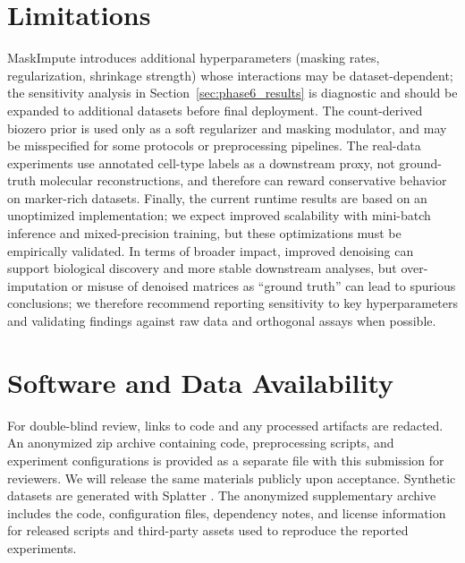 \documentclass{article}
\theoremstyle{plain}
\theoremstyle{definition}
\theoremstyle{remark}
\begin{document}
\section{Limitations}
MaskImpute introduces additional hyperparameters (masking rates, regularization,
shrinkage strength) whose interactions may be dataset-dependent; the sensitivity
analysis in Section~\ref{sec:phase6_results} is diagnostic and should be
expanded to additional datasets before final deployment. The count-derived
biozero prior is used only as a soft regularizer and masking modulator, and may
be misspecified for some
protocols or preprocessing pipelines. The real-data experiments use annotated
cell-type labels as a downstream proxy, not ground-truth molecular
reconstructions, and therefore can reward conservative behavior on marker-rich
datasets. Finally, the current runtime results are
based on an unoptimized implementation; we expect improved scalability with
mini-batch inference and mixed-precision training, but these optimizations must
be empirically validated.
In terms of broader impact, improved denoising can support biological discovery
and more stable downstream analyses, but over-imputation or misuse of denoised
matrices as ``ground truth'' can lead to spurious conclusions; we therefore
recommend reporting sensitivity to key hyperparameters and validating findings
against raw data and orthogonal assays when possible.

\section{Software and Data Availability}
For double-blind review, links to code and any processed artifacts are redacted.
An anonymized zip archive containing code, preprocessing scripts, and experiment
configurations is provided as a separate file with this submission for
reviewers. We will release the same materials publicly upon acceptance.
Synthetic datasets are generated with Splatter \citep{zappia2017splatter}.
The anonymized supplementary archive includes the code, configuration files,
dependency notes, and license information for released scripts and third-party
assets used to reproduce the reported experiments.

\end{document}
